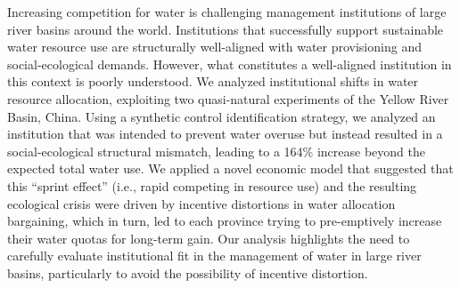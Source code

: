 Increasing competition for water is challenging management institutions of large river basins around the world.
Institutions that successfully support sustainable water resource use are structurally well-aligned with water provisioning and social-ecological demands.
However, what constitutes a well-aligned institution in this context is poorly understood.
We analyzed institutional shifts in water resource allocation, exploiting two quasi-natural experiments of the Yellow River Basin, China.
Using a synthetic control identification strategy, we analyzed an institution that was intended to prevent water overuse but instead resulted in a social-ecological structural mismatch, leading to a 164\% increase beyond the expected total water use.
We applied a novel economic model that suggested that this “sprint effect” (i.e., rapid competing in resource use) and the resulting ecological crisis were driven by incentive distortions in water allocation bargaining, which in turn, led to each province trying to pre-emptively increase their water quotas for long-term gain.
Our analysis highlights the need to carefully evaluate institutional fit in the management of water in large river basins, particularly to avoid the possibility of incentive distortion.
